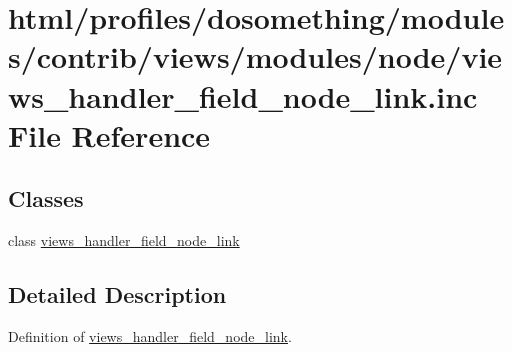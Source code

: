 \hypertarget{views__handler__field__node__link_8inc}{
\section{html/profiles/dosomething/modules/contrib/views/modules/node/views\_\-handler\_\-field\_\-node\_\-link.inc File Reference}
\label{views__handler__field__node__link_8inc}
}
\subsection*{Classes}
\begin{DoxyCompactItemize}
\item 
class \hyperlink{classviews__handler__field__node__link}{views\_\-handler\_\-field\_\-node\_\-link}
\end{DoxyCompactItemize}


\subsection{Detailed Description}
Definition of \hyperlink{classviews__handler__field__node__link}{views\_\-handler\_\-field\_\-node\_\-link}. 
